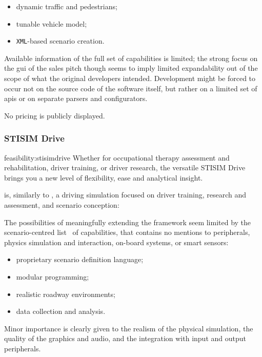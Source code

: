 \begin{itemize}
	\item dynamic traffic and pedestrians;
    \item tunable vehicle model;
    \item \texttt{XML}-based scenario creation.
\end{itemize}

Available information of the full set of capabilities is limited; the strong focus on the \gls{gui} of the sales pitch though seems to imply limited expandability out of the scope of what the original developers intended. Development might be forced to occur not on the source code of the software itself, but rather on a limited set of \glspl{api} or on separate parsers and configurators.

No pricing is publicly displayed.

\subsubsection{STISIM Drive}

\begin{excerpt}{feasibility:stisimdrive}
Whether for occupational therapy assessment and rehabilitation, driver training, or driver research, the versatile STISIM Drive brings you a new level of flexibility, ease and analytical insight.
\end{excerpt}

 is, similarly to , a driving simulation focused on driver training, research and assessment, and scenario conception:

The possibilities of meaningfully extending the \gls{framework} seem limited by the scenario-centred list~\cite{feasibility:stisimdrivefeatures} of capabilities, that contains no mentions to peripherals, physics simulation and interaction, on-board systems, or smart sensors:

\begin{itemize}
	\item proprietary scenario definition language;
    \item modular programming;
    \item realistic roadway environments;
    \item data collection and analysis.
\end{itemize}

Minor importance is clearly given to the realism of the physical simulation, the quality of the graphics and audio, and the integration with input and output peripherals.

